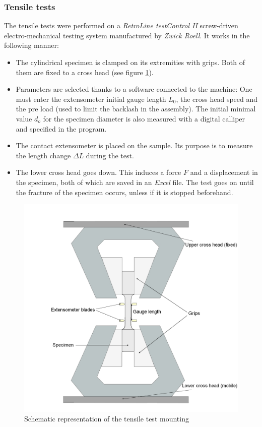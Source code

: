 \subsubsection{Tensile tests}

The tensile tests were performed on a \textit{RetroLine testControl II} screw-driven electro-mechanical testing system manufactured by \textit{Zwick Roell}. It works in the following manner:

\begin{itemize}
\item The cylindrical specimen is clamped on its extremities with grips. Both of them are fixed to a cross head (see figure \ref{fig:Trac}).

\item Parameters are selected thanks to a software connected to the machine: 
One must enter the extensometer initial gauge length $L_0$, the cross head speed and the pre load (used to limit the backlash in the assembly). The initial minimal value $d_o$ for the specimen diameter is also measured with a digital calliper and specified in the program.

\item The contact extensometer is placed on the sample. Its purpose is to measure the length change $\Delta L$ during the test. 

\item The lower cross head goes down. This induces a force $F$ and a displacement in the specimen, both of which are saved in an \textit{Excel} file. The test goes on until the fracture of the specimen occurs, unless if it is stopped beforehand.
\end{itemize}

\begin{figure}[ht]
\centering
\centerline{\includegraphics[scale=0.3]{Images/Trac}}
\decoRule
\caption[Schematic representation of the tensile test mounting]{Schematic representation of the tensile test mounting}
\label{fig:Trac}
\end{figure}

